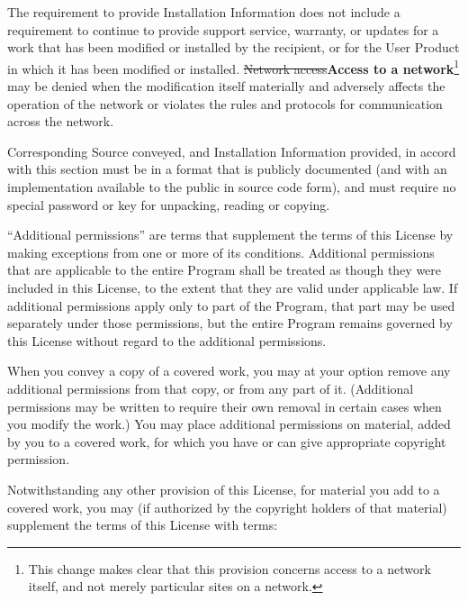 \documentclass[11pt]{article}
\newcounter{v2section}
\newcounter{v3section}
\newcounter{dv3section}
\begin{document}
The requirement to provide Installation Information does not include a
requirement to continue to provide support service, warranty, or updates
for a work that has been modified or installed by the recipient, or for the
User Product in which it has been modified or installed.  \sout{Network
access}\textbf{Access to a network}\footnote{This change makes clear that
this provision concerns access to a network itself, and not merely
particular sites on a network.} may be denied when the modification itself
materially and adversely affects the operation of the network or violates
the rules and protocols for communication across the network.

Corresponding Source conveyed, and Installation Information provided,
in accord with this section must be in a format that is publicly
documented (and with an implementation available to the public in
source code form), and must require no special password or key for
unpacking, reading or copying.


  ``Additional permissions'' are terms that supplement the terms of this
License by making exceptions from one or more of its conditions.
Additional permissions that are applicable to the entire Program shall
be treated as though they were included in this License, to the extent
that they are valid under applicable law.  If additional permissions
apply only to part of the Program, that part may be used separately
under those permissions, but the entire Program remains governed by this
License without regard to the additional permissions.

  When you convey a copy of a covered work, you may at your option
remove any additional permissions from that copy, or from any part of
it.  (Additional permissions may be written to require their own
removal in certain cases when you modify the work.)  You may place
additional permissions on material, added by you to a covered work,
for which you have or can give appropriate copyright permission.

 Notwithstanding any other provision of this License, for material
you add to a covered work, you may (if authorized by the copyright
holders of that material) supplement the terms of this License with
terms:
\end{document}
